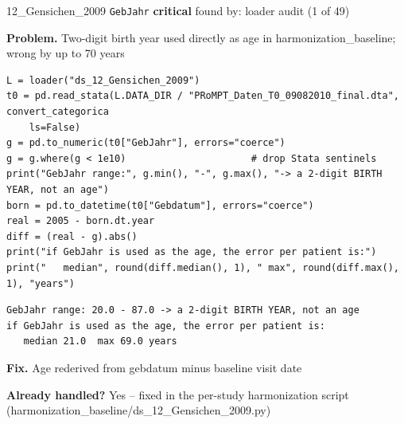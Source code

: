 \documentclass[9pt, t, handout]{beamer}
\newcommand{\ans}[1]{\textcolor{structure.fg}{#1}}
\begin{document}
\begin{frame}[fragile]{12\_Gensichen\_2009 \quad \texttt{GebJahr}}
  {\scriptsize\textcolor{red!70!black}{\textbf{critical}} \quad
   found by: loader audit \quad (1 of 49)}
  \vspace{3pt}

  {\footnotesize \textbf{Problem.} Two-digit birth year used directly as age in harmonization\_baseline; wrong by up to 70 years}
  \vspace{4pt}

  \begin{Verbatim}[fontsize=\tiny, frame=single, framesep=2pt, label=\tiny reproduce]
L = loader("ds_12_Gensichen_2009")
t0 = pd.read_stata(L.DATA_DIR / "PRoMPT_Daten_T0_09082010_final.dta", convert_categorica
    ls=False)
g = pd.to_numeric(t0["GebJahr"], errors="coerce")
g = g.where(g < 1e10)                      # drop Stata sentinels
print("GebJahr range:", g.min(), "-", g.max(), "-> a 2-digit BIRTH YEAR, not an age")
born = pd.to_datetime(t0["Gebdatum"], errors="coerce")
real = 2005 - born.dt.year
diff = (real - g).abs()
print("if GebJahr is used as the age, the error per patient is:")
print("   median", round(diff.median(), 1), " max", round(diff.max(), 1), "years")
  \end{Verbatim}
  \begin{Verbatim}[fontsize=\tiny, frame=single, framesep=2pt, label=\tiny output]
GebJahr range: 20.0 - 87.0 -> a 2-digit BIRTH YEAR, not an age
if GebJahr is used as the age, the error per patient is:
   median 21.0  max 69.0 years
  \end{Verbatim}
  \vspace{2pt}

  {\footnotesize \textbf{Fix.} Age rederived from gebdatum minus baseline visit date}
  \vspace{2pt}

  {\footnotesize \textbf{Already handled?} \ans{Yes} -- fixed in the per-study harmonization script
   (harmonization\_baseline/ds\_12\_Gensichen\_2009.py)}
\end{frame}
\end{document}
